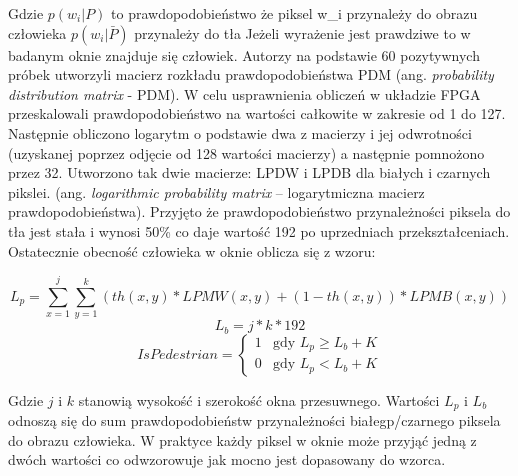 Gdzie \( p(w_i|P) \) to prawdopodobieństwo że piksel w_i przynależy do obrazu człowieka
\( p(w_i|\bar{P}) \) przynależy do tła
Jeżeli wyrażenie jest prawdziwe to w badanym oknie znajduje się człowiek. Autorzy na podstawie 60 pozytywnych próbek utworzyli macierz rozkładu prawdopodobieństwa PDM (ang. \textit{probability distribution matrix} - PDM). W celu usprawnienia obliczeń w układzie FPGA przeskalowali prawdopodobieństwo na wartości całkowite w zakresie od 1 do 127. Następnie obliczono logarytm o podstawie dwa z macierzy i jej odwrotności (uzyskanej poprzez odjęcie od 128 wartości macierzy) a następnie pomnożono przez 32. Utworzono tak dwie macierze: LPDW i LPDB dla białych i czarnych pikslei. (ang. \textit{logarithmic probability matrix} – logarytmiczna macierz prawdopodobieństwa). Przyjęto że prawdopodobieństwo przynależności piksela do tła jest stała i wynosi 50\% co daje wartość 192 po uprzedniach przekształceniach. Ostatecznie obecność człowieka w oknie oblicza się z wzoru: 

\begin{equation}\label{equ:Lp}
L_{p} = \sum_{x=1}^{j}\sum_{y=1}^{k}(th(x,y)*LPMW(x,y)+(1-th(x,y))*LPMB(x,y))
\end{equation}
\begin{equation}\label{equ:Lb}
L_{b} = j*k*192
\end{equation}
\begin{equation} \label{equ:ispedistant}
IsPedestrian = \left\{ \begin{array}{ll}
1 & \textrm{gdy $L_{p} 	\geq L_{b} + K$}\\
0 & \textrm{gdy $L_{p}<L_{b} + K$}
\end{array} \right.
\end{equation}

\noindent Gdzie $j$ i $k$ stanowią wysokość i szerokość okna przesuwnego. Wartości $L_p$ i $L_b$ odnoszą się do sum prawdopodobieństw przynależności białegp/czarnego piksela do obrazu człowieka. W praktyce każdy piksel w oknie może przyjąć jedną z dwóch wartości co odwzorowuje jak mocno jest dopasowany do wzorca. 
